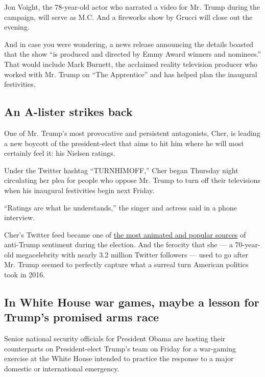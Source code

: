 Jon Voight, the 78-year-old actor who narrated a video for Mr. Trump
during the campaign, will serve as M.C. And a fireworks show by Grucci
will close out the evening.

And in case you were wondering, a news release announcing the details
boasted that the show ``is produced and directed by Emmy Award winners
and nominees.'' That would include Mark Burnett, the acclaimed reality
television producer who worked with Mr. Trump on ``The Apprentice'' and
has helped plan the inaugural festivities.

\hypertarget{an-a-lister-strikes-back}{%
\subsection{An A-lister strikes back}\label{an-a-lister-strikes-back}}

One of Mr. Trump's most provocative and persistent antagonists, Cher, is
leading a new boycott of the president-elect that aims to hit him where
he will most certainly feel it: his Nielsen ratings.

Under the Twitter hashtag ``TURNHIMOFF,'' Cher began Thursday night
circulating her plea for people who oppose Mr. Trump to turn off their
televisions when his inaugural festivities begin next Friday.

``Ratings are what he understands,'' the singer and actress said in a
phone interview.

Cher's Twitter feed became one of
\href{https://www.nytimes.com/2016/09/04/fashion/cher-hillary-clinton-donald-trump-twitter.html}{the
most animated and popular sources} of anti-Trump sentiment during the
election. And the ferocity that she --- a 70-year-old megacelebrity with
nearly 3.2 million Twitter followers --- used to go after Mr. Trump
seemed to perfectly capture what a surreal turn American politics took
in 2016.

\hypertarget{in-white-house-war-games-maybe-a-lesson-for-trumps-promised-arms-race}{%
\subsection{In White House war games, maybe a lesson for Trump's
promised arms
race}\label{in-white-house-war-games-maybe-a-lesson-for-trumps-promised-arms-race}}

Senior national security officials for President Obama are hosting their
counterparts on President-elect Trump's team on Friday for a war-gaming
exercise at the White House intended to practice the response to a major
domestic or international emergency.

